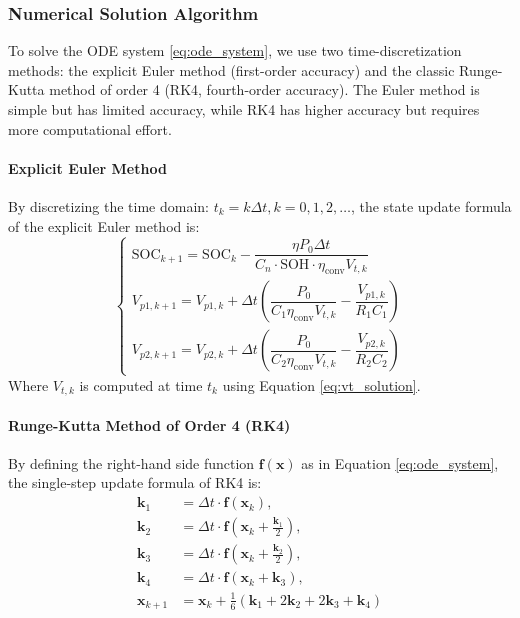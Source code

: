 \subsubsection{Numerical Solution Algorithm}
To solve the ODE system \eqref{eq:ode_system}, we use two time-discretization methods: 
the explicit Euler method (first-order accuracy) and the classic Runge-Kutta method of order 4 (RK4, fourth-order accuracy). 
The Euler method is simple but has limited accuracy, while RK4 has higher accuracy but requires more computational effort.

\paragraph{Explicit Euler Method}
By discretizing the time domain: $t_k = k\Delta t, k=0,1,2,\dots$, the state update formula of the explicit Euler method is:
\begin{equation}
\begin{cases}
\text{SOC}_{k+1} = \text{SOC}_k - \dfrac{\eta P_0 \Delta t}{C_n \cdot \text{SOH} \cdot \eta_{\text{conv}} V_{t,k}} \\[10pt]
V_{p1,k+1} = V_{p1,k} + \Delta t \left( \dfrac{P_0}{C_1 \eta_{\text{conv}} V_{t,k}} - \dfrac{V_{p1,k}}{R_1 C_1} \right) \\[10pt]
V_{p2,k+1} = V_{p2,k} + \Delta t \left( \dfrac{P_0}{C_2 \eta_{\text{conv}} V_{t,k}} - \dfrac{V_{p2,k}}{R_2 C_2} \right)
\end{cases}
\label{eq:euler}
\end{equation}
Where $V_{t,k}$ is computed at time $t_k$ using Equation \eqref{eq:vt_solution}.

\paragraph{Runge-Kutta Method of Order 4 (RK4)}
By defining the right-hand side function $\mathbf{f}(\mathbf{x})$ as in Equation \eqref{eq:ode_system}, 
the single-step update formula of RK4 is:
\begin{equation}
\begin{aligned}
\mathbf{k}_1 &= \Delta t \cdot \mathbf{f}(\mathbf{x}_k), \\
\mathbf{k}_2 &= \Delta t \cdot \mathbf{f}\left(\mathbf{x}_k + \frac{\mathbf{k}_1}{2}\right), \\
\mathbf{k}_3 &= \Delta t \cdot \mathbf{f}\left(\mathbf{x}_k + \frac{\mathbf{k}_2}{2}\right), \\
\mathbf{k}_4 &= \Delta t \cdot \mathbf{f}\left(\mathbf{x}_k + \mathbf{k}_3\right), \\
\mathbf{x}_{k+1} &= \mathbf{x}_k + \frac{1}{6}(\mathbf{k}_1 + 2\mathbf{k}_2 + 2\mathbf{k}_3 + \mathbf{k}_4)
\end{aligned}
\label{eq:rk4}
\end{equation}

